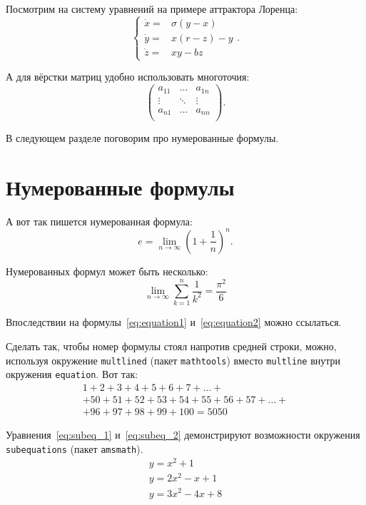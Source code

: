\documentclass{cmcmsuthesis-phd}
\begin{document}
Посмотрим на систему уравнений на примере аттрактора Лоренца:
\[\left\{
\begin{array}{rl}
    \dot x = & \sigma (y-x)  \\
    \dot y = & x (r - z) - y \\
    \dot z = & xy - bz
\end{array}\right..\]

А для вёрстки матриц удобно использовать многоточия:
\[\left(\begin{array}{ccc}
a_{11} & \ldots & a_{1n} \\
\vdots & \ddots & \vdots \\
a_{n1} & \ldots & a_{nn} \\
\end{array} \right).\]

В следующем разделе поговорим про нумерованные формулы.
\section{Нумерованные формулы}
\label{subsec:ch1/sec3/sub3}
А вот так пишется нумерованная формула:
\begin{equation}
\label{eq:equation1}
 e = \lim_{n \to \infty} \left( 1+\frac{1}{n} \right)^n.
\end{equation}

Нумерованных формул может быть несколько:
\begin{equation}
\label{eq:equation2}
\lim_{n \to \infty} \sum_{k=1}^n \frac{1}{k^2} = \frac{\pi^2}{6}
\end{equation}

Впоследствии на формулы~\eqref{eq:equation1} и~\eqref{eq:equation2} можно ссылаться.

Сделать так, чтобы номер формулы стоял напротив средней строки, можно, используя окружение \texttt{multlined} (пакет \texttt{mathtools}) вместо \texttt{multline} внутри окружения \texttt{equation}. Вот так:
\begin{equation}
\label{eq:equation3}
\begin{multlined}
        1+ 2+3+4+5+6+7+\dots + \\
        + 50+51+52+53+54+55+56+57 + \dots + \\
        + 96+97+98+99+100=5050
\end{multlined}
\end{equation}

Уравнения~\eqref{eq:subeq_1} и~\eqref{eq:subeq_2} демонстрируют возможности окружения \texttt{subequations} (пакет \texttt{amsmath}).
\begin{subequations}
\label{eq:subeq_1}
\begin{gather}
        y = x^2 + 1\label{eq:subeq_1-1} \\
        y = 2 x^2 - x + 1\label{eq:subeq_1-2} \\
        y = 3 x^2 - 4x + 8\label{eq:subeq_1-3}
    \end{gather}
\end{subequations}
\end{document}
